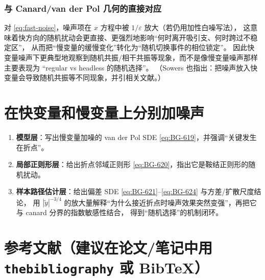 \documentclass[a4paper,twoside,openany,UTF8]{article}  %
\numberwithin{equation}{section}  %
\numberwithin{equation}{section}  %
\begin{document}
\subsubsection{与 Canard/van der Pol 几何的直接对应}
对 \eqref{eq:fast-noise}，噪声项在 $x$ 方程中被 $1/\varepsilon$ 放大（若仍用加性白噪写法），
这意味着快方向的随机扰动会更直接、更强烈地影响“何时离开吸引支、何时跨过不稳定区”，
从而把“慢变量的缓慢变化”转化为“随机切换事件的相位锁定”。
因此快变量噪声下更典型地观察到随机共振/相干共振等现象，而不是像慢变量噪声那样主要表现为
“regular vs headless 的随机选择”。
（Sowers 也指出：把噪声放入快变量会导致随机共振等不同现象，并引相关文献。）%

\section{在快变量和慢变量上分别加噪声}


\begin{enumerate}
	\item \textbf{模型层}：写出慢变量加噪的 van der Pol SDE \eqref{eq:BG-619}，并强调“关键发生在折点”。%
	\item \textbf{局部正则形层}：给出折点邻域正则形 \eqref{eq:BG-620}，指出它是鞍结正则形的随机扰动。%
	\item \textbf{样本路径估计层}：给出偏差 SDE \eqref{eq:BG-621}--\eqref{eq:BG-624} 与方差/扩散尺度结论，
	用 $|\tilde y|^{-3/4}$ 的放大量解释“为什么接近折点时噪声效果突然变强”，再把它与 canard 分界的指数敏感性结合，
	得到“随机选择”的机制闭环。%
\end{enumerate}

\section{参考文献（建议在论文/笔记中用 \texttt{thebibliography} 或 Bib\TeX{}）}
\end{document}
